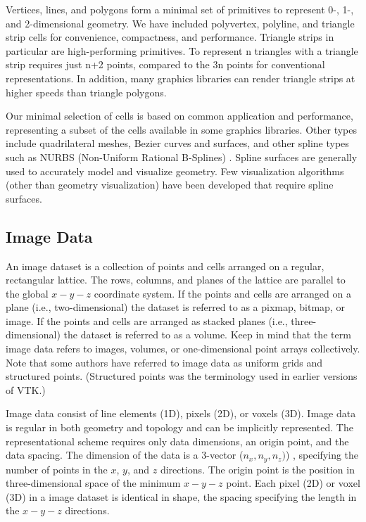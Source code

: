 Vertices, lines, and polygons form a minimal set of primitives to represent 0-, 1-, and 2-dimensional geometry. We have included polyvertex, polyline, and triangle strip cells for convenience, compactness, and performance. Triangle strips in particular are high-performing primitives. To represent n triangles with a triangle strip requires just n+2 points, compared to the 3n points for conventional representations. In addition, many graphics libraries can render triangle strips at higher speeds than triangle polygons.

Our minimal selection of cells is based on common application and performance, representing a subset of the cells available in some graphics libraries. Other types include quadrilateral meshes, Bezier curves and surfaces, and other spline types such as NURBS (Non-Uniform Rational B-Splines) \cite{Mortenson85}. Spline surfaces are generally used to accurately model and visualize geometry. Few visualization algorithms (other than geometry visualization) have been developed that require spline surfaces.

\subsection{Image Data}
\label{subsec:image_data}

An image dataset is a collection of points and cells arranged on a regular, rectangular lattice. The rows, columns, and planes of the lattice are parallel to the global $x-y-z$ coordinate system. If the points and cells are arranged on a plane (i.e., two-dimensional) the dataset is referred to as a pixmap, bitmap, or image. If the points and cells are arranged as stacked planes (i.e., three-dimensional) the dataset is referred to as a volume. Keep in mind that the term image data refers to images, volumes, or one-dimensional point arrays collectively. Note that some authors have referred to image data as uniform grids and structured points. (Structured points was the terminology used in earlier versions of VTK.)

Image data consist of line elements (1D), pixels (2D), or voxels (3D). Image data is regular in both geometry and topology and can be implicitly represented. The representational scheme requires only data dimensions, an origin point, and the data spacing. The dimension of the data is a 3-vector ($n_x,n_y,n_z)$) , specifying the number of points in the $x$, $y$, and $z$ directions. The origin point is the position in three-dimensional space of the minimum $x-y-z$ point. Each pixel (2D) or voxel (3D) in a image dataset is identical in shape, the spacing specifying the length in the $x-y-z$ directions.

